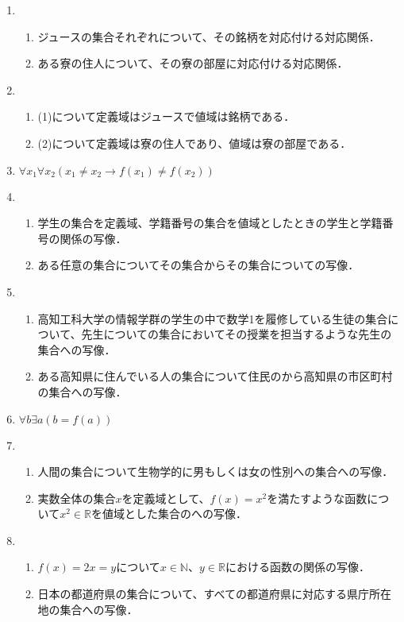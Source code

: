 \documentclass[uplatex]{jsarticle}
\begin{document}
\begin{enumerate}
\vspace{12pt}
	\item 
		\begin{enumerate}
			\item ジュースの集合それぞれについて、その銘柄を対応付ける対応関係．
			\item ある寮の住人について、その寮の部屋に対応付ける対応関係．
		\end{enumerate}
	\item
		\begin{enumerate}
			\item (1)について定義域はジュースで値域は銘柄である．
			\item (2)について定義域は寮の住人であり、値域は寮の部屋である．
		\end{enumerate}
		
	\item $\forall x_1 \forall x_2 ( x_1 \neq x_2 \rightarrow f(x_1) \neq f(x_2))$
	\item 
		\begin{enumerate}
			\item 学生の集合を定義域、学籍番号の集合を値域としたときの学生と学籍番号の関係の写像．
			\item ある任意の集合についてその集合からその集合についての写像．
		\end{enumerate}
	\item
		\begin{enumerate}
			\item 高知工科大学の情報学群の学生の中で数学1を履修している生徒の集合について、先生についての集合においてその授業を担当するような先生の集合への写像．
			\item ある高知県に住んでいる人の集合について住民のから高知県の市区町村の集合への写像．
		\end{enumerate}

	\item $\forall b \exists a ( b = f(a))$

	\item
		\begin{enumerate}
			\item 人間の集合について生物学的に男もしくは女の性別への集合への写像．
			\item 実数全体の集合$x$を定義域として、$f(x) = x ^ 2$を満たすような函数について$x ^2 \in \mathbb{R}$を値域とした集合のへの写像．
		\end{enumerate}
	\item 
		\begin{enumerate}
			\item $f(x)=2x=y$について$x \in \mathbb{N}$、$y \in \mathbb{R}$における函数の関係の写像．
			\item 日本の都道府県の集合について、すべての都道府県に対応する県庁所在地の集合への写像．
		\end{enumerate}

\end{enumerate}
\end{document}
